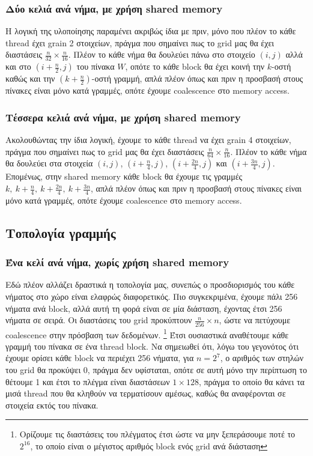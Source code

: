 \documentclass[11pt,a4paper,titlepage]{article}
\begin{document}
\subsubsection{Δύο κελιά ανά νήμα, με χρήση shared memory}
Η λογική της υλοποίησης παραμένει ακριβώς ίδια με πριν, μόνο που πλέον το κάθε thread έχει grain 2 στοιχείων, πράγμα που σημαίνει πως το grid μας θα έχει διαστάσεις $\tfrac{n}{32}\times\tfrac{n}{16}$. Πλέον το κάθε νήμα θα δουλεύει πάνω στο στοιχείο $(i, j)$ αλλά και στο $(i + \tfrac{n}{2}, j)$ του πίνακα $W$, οπότε το κάθε block θα έχει κοινή την $k$-οστή καθώς και την $(k+\tfrac{n}{2})$-οστή γραμμή, απλά πλέον όπως και πριν η προσβασή στους πίνακες είναι μόνο κατά γραμμές, οπότε έχουμε coalescence στο memory access.

\subsubsection{Τέσσερα κελιά ανά νήμα, με χρήση shared memory}
Ακολουθώντας την ίδια λογική, έχουμε το κάθε thread να έχει grain 4 στοιχείων, πράγμα που σημαίνει πως το grid μας θα έχει διαστάσεις $\tfrac{n}{64}\times\tfrac{n}{16}$. Πλέον το κάθε νήμα θα δουλεύει στα στοιχεία $\left(i, j\right)$, $\left(i + \tfrac{n}{4}, j\right)$, $\left(i + \tfrac{2n}{4}, j\right)$ και $\left(i + \tfrac{3n}{4}, j\right)$. Επομένως, στην shared memory κάθε block θα έχουμε τις γραμμές $k,\ k + \tfrac{n}{4},\ k + \tfrac{2n}{4},\ k + \tfrac{3n}{4}$, απλά πλέον όπως και πριν η προσβασή στους πίνακες είναι μόνο κατά γραμμές, οπότε έχουμε coalescence στο memory access.

\subsection{Τοπολογία γραμμής}
\subsubsection{Ένα κελί ανά νήμα, χωρίς χρήση shared memory}
Εδώ πλέον αλλάζει δραστικά η τοπολογία μας, συνεπώς ο προσδιορισμός του κάθε νήματος στο χώρο είναι ελαφρώς διαφορετικός. Πιο συγκεκριμένα, έχουμε πάλι 256 νήματα ανά block, αλλά αυτή τη φορά είναι σε μία διάσταση, έχοντας έτσι 256 νήματα σε σειρά. Οι διαστάσεις του grid προκύπτουν $\tfrac{n}{256}\times n$,   ώστε να πετύχουμε coalescence στην πρόσβαση των δεδομένων. \footnote{Ορίζουμε τις διαστάσεις του πλέγματος έτσι ώστε να μην ξεπεράσουμε ποτέ το $2^{16}$, το οποίο είναι ο μέγιστος αριθμός block ενός grid ανά διάσταση} Έτσι ουσιαστικά αναθέτουμε κάθε γραμμή του πίνακα σε ένα thread block. Να σημειωθεί ότι, λόγω του γεγονότος ότι έχουμε ορίσει κάθε block να περιέχει 256 νήματα, για $n = 2^7$, ο αριθμός των στηλών του grid θα προκύψει 0, πράγμα δεν υφίσταται, οπότε σε αυτή μόνο την περίπτωση το θέτουμε 1 και έτσι το πλέγμα είναι διαστάσεων $1\times 128$, πράγμα το οποίο θα κάνει τα μισά thread που θα κληθούν να τερματίσουν αμέσως, καθώς θα αναφέρονται σε στοιχεία εκτός του πίνακα.
\end{document}
